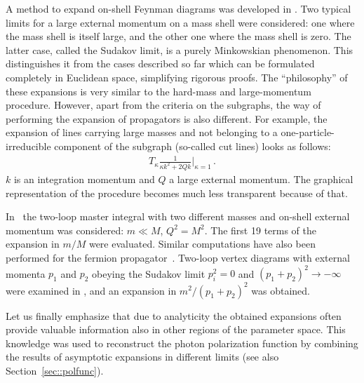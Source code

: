A method to expand on-shell Feynman diagrams was developed in
\cite{Smi97,CzaSmi97}.  Two typical limits for a large external momentum
on a mass shell were considered: one where the mass shell is itself
large, and the other one where the mass shell is zero.
The latter case, called the Sudakov
limit, is a purely Minkowskian phenomenon. This distinguishes it from
the cases described so far which can be formulated completely in
Euclidean space, simplifying rigorous proofs.  The ``philosophy'' of
these expansions is very similar to the hard-mass and large-momentum
procedure.  However, apart from the criteria on the subgraphs, the way of
performing the expansion of propagators is also different. For example,
the expansion of lines carrying large masses and not belonging to a
one-particle-irreducible component of the subgraph (so-called cut lines)
looks as follows:
\begin{eqnarray}
T_\kappa\frac{1}{\kappa k^2 + 2Qk}\Bigg|_{\kappa=1}
\,.
\end{eqnarray}
$k$ is an integration momentum and $Q$ a large external momentum.  The
graphical representation of the procedure becomes much less transparent
because of that.

In~\cite{CzaSmi97} the two-loop master integral with two different
masses and on-shell external momentum was considered: $m\ll M$,
$Q^2=M^2$. The first 19 terms of the expansion in $m/M$ were evaluated.
Similar computations have also been performed for the fermion
propagator~\cite{AvdKal97}.  Two-loop vertex diagrams with external
momenta $p_1$ and $p_2$ obeying the Sudakov limit $p_i^2=0$ and
$(p_1+p_2)^2\to-\infty$ were examined in \cite{Smi97_2}, and an
expansion in $m^2/(p_1+p_2)^2$ was obtained.

Let us finally emphasize that due to analyticity the obtained expansions
often provide valuable information also in other regions of the
parameter space. This knowledge was used to reconstruct the photon
polarization function by combining the results of asymptotic expansions
in different limits (see also Section~\ref{sec::polfunc}).


